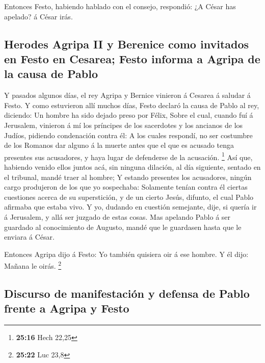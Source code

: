  Entonces Festo, habiendo hablado con el consejo,
respondió: ¿A César has apelado? á César irás.

\hypertarget{herodes-agripa-ii-y-berenice-como-invitados-en-festo-en-cesarea-festo-informa-a-agripa-de-la-causa-de-pablo}{%
\subsection{Herodes Agripa II y Berenice como invitados en Festo en
Cesarea; Festo informa a Agripa de la causa de
Pablo}\label{herodes-agripa-ii-y-berenice-como-invitados-en-festo-en-cesarea-festo-informa-a-agripa-de-la-causa-de-pablo}}

 Y pasados algunos días, el rey Agripa y Bernice vinieron á
Cesarea á saludar á Festo.  Y como estuvieron allí muchos
días, Festo declaró la causa de Pablo al rey, diciendo: Un hombre ha
sido dejado preso por Félix,  Sobre el cual, cuando fuí á
Jerusalem, vinieron á mí los príncipes de los sacerdotes y los ancianos
de los Judíos, pidiendo condenación contra él:  A los
cuales respondí, no ser costumbre de los Romanos dar alguno á la muerte
antes que el que es acusado tenga presentes sus acusadores, y haya lugar
de defenderse de la acusación. \footnote{\textbf{25:16} Hech 22,25}
 Así que, habiendo venido ellos juntos acá, sin ninguna
dilación, al día siguiente, sentado en el tribunal, mandé traer al
hombre;  Y estando presentes los acusadores, ningún cargo
produjeron de los que yo sospechaba:  Solamente tenían
contra él ciertas cuestiones acerca de su superstición, y de un cierto
Jesús, difunto, el cual Pablo afirmaba que estaba vivo.  Y
yo, dudando en cuestión semejante, dije, si quería ir á Jerusalem, y
allá ser juzgado de estas cosas.  Mas apelando Pablo á ser
guardado al conocimiento de Augusto, mandé que le guardasen hasta que le
enviara á César.

 Entonces Agripa dijo á Festo: Yo también quisiera oir á
ese hombre. Y él dijo: Mañana le oirás. \footnote{\textbf{25:22} Luc
  23,8}

\hypertarget{discurso-de-manifestaciuxf3n-y-defensa-de-pablo-frente-a-agripa-y-festo}{%
\subsection{Discurso de manifestación y defensa de Pablo frente a Agripa
y
Festo}\label{discurso-de-manifestaciuxf3n-y-defensa-de-pablo-frente-a-agripa-y-festo}}

